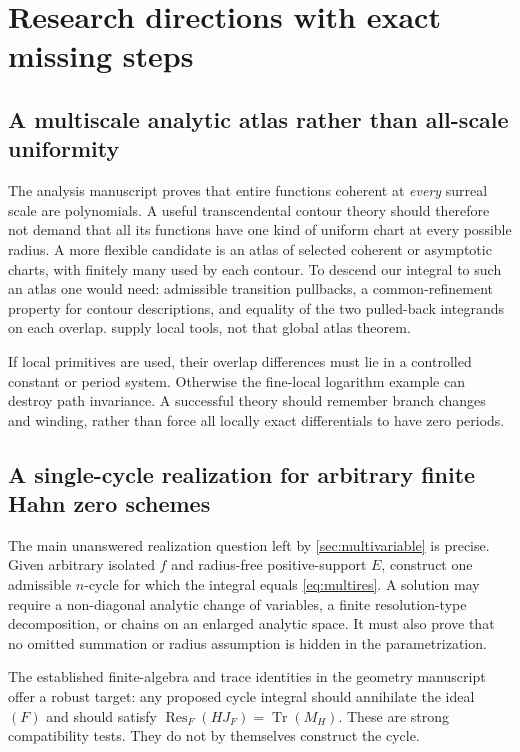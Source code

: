 \documentclass[11pt,letterpaper]{article}
\theoremstyle{definition}
\theoremstyle{remark}
\newcommand{\Res}{\operatorname{Res}}\newcommand{\res}{\operatorname{res}}\newcommand{\ord}{\operatorname{ord}}\newcommand{\Tr}{\operatorname{Tr}}
\numberwithin{equation}{section}
\begin{document}
\section{Research directions with exact missing steps}\label{sec:research}
\subsection{A multiscale analytic atlas rather than all-scale uniformity}
The analysis manuscript proves that entire functions coherent at \emph{every} surreal scale are polynomials. A useful transcendental contour theory should therefore not demand that all its functions have one kind of uniform chart at every possible radius. A more flexible candidate is an atlas of selected coherent or asymptotic charts, with finitely many used by each contour. To descend our integral to such an atlas one would need: admissible transition pullbacks, a common-refinement property for contour descriptions, and equality of the two pulled-back integrands on each overlap.  supply local tools, not that global atlas theorem.

If local primitives are used, their overlap differences must lie in a controlled constant or period system. Otherwise the fine-local logarithm example can destroy path invariance. A successful theory should remember branch changes and winding, rather than force all locally exact differentials to have zero periods.

\subsection{A single-cycle realization for arbitrary finite Hahn zero schemes}
The main unanswered realization question left by \cref{sec:multivariable} is precise. Given arbitrary isolated $f$ and radius-free positive-support $E$, construct one admissible $n$-cycle for which the integral equals \eqref{eq:multires}. A solution may require a non-diagonal analytic change of variables, a finite resolution-type decomposition, or chains on an enlarged analytic space. It must also prove that no omitted summation or radius assumption is hidden in the parametrization.

The established finite-algebra and trace identities in the geometry manuscript offer a robust target: any proposed cycle integral should annihilate the ideal $(F)$ and should satisfy $\Res_F(HJ_F)=\Tr(M_H)$. These are strong compatibility tests. They do not by themselves construct the cycle.
\end{document}
